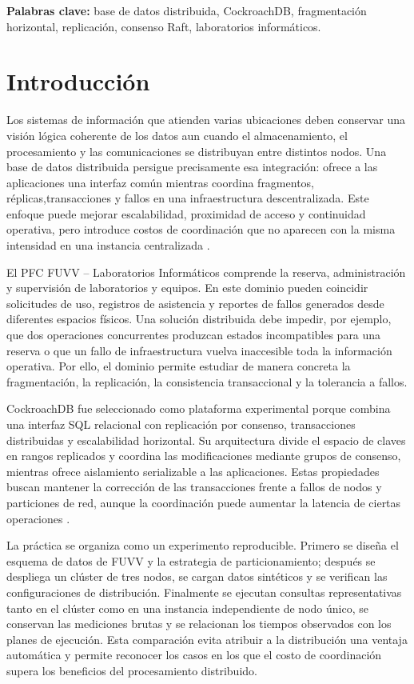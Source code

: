 \documentclass[12pt,a4paper]{article}
\begin{document}
\noindent\textbf{Palabras clave:} base de datos distribuida, CockroachDB, fragmentación horizontal, replicación, consenso Raft, laboratorios informáticos.

\section{Introducción}
\label{sec:introduccion}

Los sistemas de información que atienden varias ubicaciones deben conservar una visión lógica coherente de los datos aun cuando el almacenamiento, el procesamiento y las comunicaciones se distribuyan entre distintos nodos. Una base de datos distribuida persigue precisamente esa integración: ofrece a las aplicaciones una interfaz común mientras coordina fragmentos, réplicas,transacciones y fallos en una infraestructura descentralizada. Este enfoque puede mejorar escalabilidad, proximidad de acceso y continuidad operativa, pero introduce costos de coordinación que no aparecen con la misma intensidad en una instancia centralizada \cite{ozsu2020distributed,kleppmann2017ddia}.

El PFC FUVV -- Laboratorios Informáticos comprende la reserva, administración y supervisión de laboratorios y equipos. En este dominio pueden coincidir solicitudes de uso, registros de asistencia y reportes de fallos generados desde diferentes espacios físicos. Una solución distribuida debe impedir, por ejemplo, que dos operaciones concurrentes produzcan estados incompatibles para una reserva o que un fallo de infraestructura vuelva inaccesible toda la información operativa. Por ello, el dominio permite estudiar de manera concreta la fragmentación, la replicación, la consistencia transaccional y la tolerancia a fallos.

CockroachDB fue seleccionado como plataforma experimental porque combina una interfaz SQL relacional con replicación por consenso, transacciones distribuidas y escalabilidad horizontal. Su arquitectura divide el espacio de claves en rangos replicados y coordina las modificaciones mediante grupos de consenso, mientras ofrece aislamiento serializable a las aplicaciones. Estas propiedades buscan mantener la corrección de las transacciones frente a fallos de nodos y particiones de red, aunque la coordinación puede aumentar la latencia de ciertas operaciones \cite{taft2020cockroachdb,vanbenschoten2022multiregion}.

La práctica se organiza como un experimento reproducible. Primero se diseña el esquema de datos de FUVV y la estrategia de particionamiento; después se despliega un clúster de tres nodos, se cargan datos sintéticos y se verifican las configuraciones de distribución. Finalmente se ejecutan consultas representativas tanto en el clúster como en una instancia independiente de nodo único, se conservan las mediciones brutas y se relacionan los tiempos observados con los planes de ejecución. Esta comparación evita atribuir a la distribución una ventaja automática y permite reconocer los casos en los que el costo de coordinación supera los beneficios del procesamiento distribuido.
\end{document}
